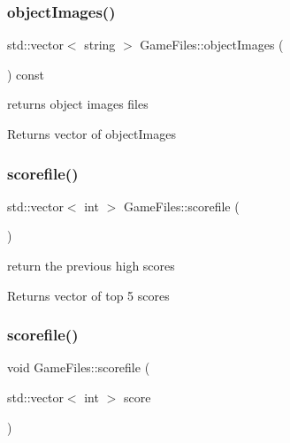 \subsubsection{\texorpdfstring{object\+Images()}{objectImages()}}
{\footnotesize\ttfamily std\+::vector$<$ string $>$ Game\+Files\+::object\+Images (\begin{DoxyParamCaption}{ }\end{DoxyParamCaption}) const}



returns object images files 

\begin{DoxyReturn}{Returns}
vector of object\+Images 
\end{DoxyReturn}
\mbox{\label{class_game_files_a101acdcafdb5ba63e9a1d1358f097f73}} 
\subsubsection{\texorpdfstring{scorefile()}{scorefile()}\hspace{0.1cm}{\footnotesize\ttfamily [1/2]}}
{\footnotesize\ttfamily std\+::vector$<$ int $>$ Game\+Files\+::scorefile (\begin{DoxyParamCaption}{ }\end{DoxyParamCaption})}



return the previous high scores 

\begin{DoxyReturn}{Returns}
vector of top 5 scores 
\end{DoxyReturn}
\mbox{\label{class_game_files_a458d9d639a6e93a8fd8c50979b6a8f7f}} 
\subsubsection{\texorpdfstring{scorefile()}{scorefile()}\hspace{0.1cm}{\footnotesize\ttfamily [2/2]}}
{\footnotesize\ttfamily void Game\+Files\+::scorefile (\begin{DoxyParamCaption}\item[{std\+::vector$<$ int $>$}]{score }\end{DoxyParamCaption})}



